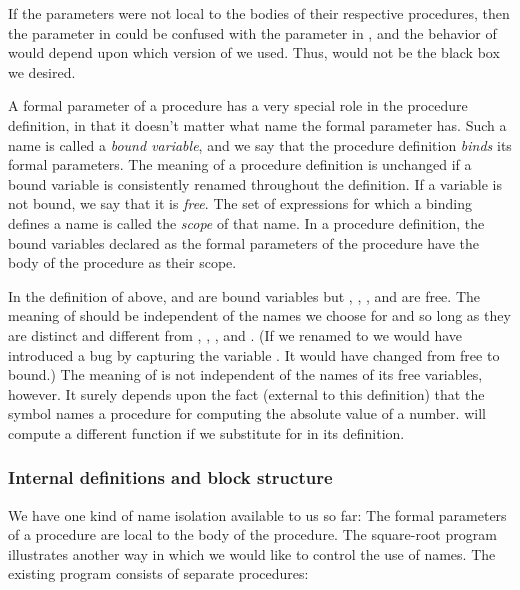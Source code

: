 If the parameters were not local to the bodies of their respective procedures, then the parameter  in  could be confused with the parameter  in , and the behavior of  would depend upon which version of  we used. Thus,  would not be the black box we desired.

A formal parameter of a procedure has a very special role in the procedure definition, in that it doesn't matter what name the formal parameter has. Such a name is called a \textit{bound variable}, and we say that the procedure definition \textit{binds} its formal parameters. The meaning of a procedure definition is unchanged if a bound variable is consistently renamed throughout the definition. If a variable is not bound, we say that it is \textit{free}. The set of expressions for which a binding defines a name is called the \textit{scope} of that name. In a procedure definition, the bound variables declared as the formal parameters of the procedure have the body of the procedure as their scope.

In the definition of  above,  and  are bound variables but \slate{<}, \slate{-}, , and  are free. The meaning of  should be independent of the names we choose for  and  so long as they are distinct and different from \slate{<}, \slate{-}, , and . (If we renamed  to  we would have introduced a bug by capturing the variable . It would have changed from free to bound.) The meaning of  is not independent of the names of its free variables, however. It surely depends upon the fact (external to this definition) that the symbol  names a procedure for computing the absolute value of a number.  will compute a different function if we substitute  for  in its definition.

\subsubsection{Internal definitions and block structure}

We have one kind of name isolation available to us so far: The formal parameters of a procedure are local to the body of the procedure. The square-root program illustrates another way in which we would like to control the use of names. The existing program consists of separate procedures:

